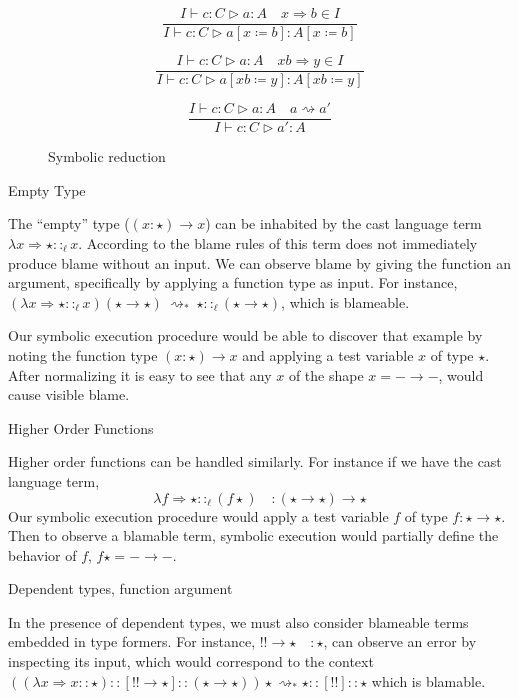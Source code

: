 \begin{figure}
  \[
  \frac{I\vdash  c:C\vartriangleright a:A\quad x\Rightarrow b\in I}{I\vdash  c:C\vartriangleright a\left[x\coloneqq b\right]:A\left[x\coloneqq b\right]}
  \]
  
  \[
  \frac{I\vdash  c:C\vartriangleright a:A\quad xb\Rightarrow y\in I}{I\vdash  c:C\vartriangleright a\left[xb\coloneqq y\right]:A\left[xb\coloneqq y\right]}
  \]
  
  \[
  \frac{I\vdash  c:C\vartriangleright a:A\quad a\rightsquigarrow a'}{I\vdash  c:C\vartriangleright a':A}
  \]
\caption{Symbolic reduction}
\label{fig:sym-env-Sym-red}
\end{figure}
 
 
\begin{example}
  Empty Type

The ``empty'' type ($\left(x:\star\right)\rightarrow x$) can be inhabited by the cast language term $\lambda x\Rightarrow\star::_{\ell }x$.
According to the blame rules of  this term does not immediately produce blame without an input.
We can observe blame by giving the function an argument, specifically by applying a function type as input.
For instance, $(\lambda x\Rightarrow\star::_{\ell }x)(\star\rightarrow\star)\ \rightsquigarrow_{*}\ \star::_{\ell }(\star\rightarrow\star)$, which is blameable.

Our symbolic execution procedure would be able to discover that example by noting the function type $\left(x:\star\right)\rightarrow x$ and applying a test variable $x$ of type $\star$.
After normalizing it is easy to see that any $x$ of the shape $x=-\rightarrow-$, would cause visible blame.
\end{example}


\begin{example}
Higher Order Functions

Higher order functions can be handled similarly.
For instance if we have the cast language term,
\[
\lambda f\Rightarrow\star::_{\ell }(f\star) \quad : \left(\star\rightarrow\star\right)\rightarrow\star
\]
  Our symbolic execution procedure would apply a test variable $f$ of type $f:\star\rightarrow\star$.
Then to observe a blamable term, symbolic execution would partially define the behavior of $f$, $f\star=-\rightarrow-$.
\end{example}

  
 \begin{example}
 Dependent types, function argument
  
 In the presence of dependent types, we must also consider blameable terms embedded in type formers.
 For instance, $!!\rightarrow\star\quad:\star$, can observe an error by inspecting its input, which would correspond to the context $\left(\left(\lambda x\Rightarrow x::\star\right)::[!!\rightarrow\star]::\left(\star\rightarrow\star\right)\right)\star\rightsquigarrow_{*}\star::[!!]::\star$ which is blamable.
 \end{example}
  
